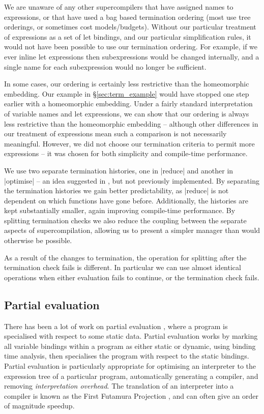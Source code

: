 \documentclass[draft]{sigplanconf}
\begin{document}
We are unaware of any other supercompilers that have assigned names to expressions, or that have used a bag based termination ordering (most use tree orderings, or sometimes cost models/budgets). Without our particular treatment of expressions as a set of let bindings, and our particular simplification rules, it would not have been possible to use our termination ordering. For example, if we ever inline let expressions then subexpressions would be changed internally, and a single name for each subexpression would no longer be sufficient.

In some cases, our ordering is certainly less restrictive than the homeomorphic embedding. Our example in \S\ref{sec:term_example} would have stopped one step earlier with a homeomorphic embedding. Under a fairly standard interpretation of variable names and let expressions, we can show that our ordering is always less restrictive than the homeomorphic embedding -- although other differences in our treatment of expressions mean such a comparison is not necessarily meaningful. However, we did not choose our termination criteria to permit more expressions -- it was chosen for both simplicity and compile-time performance.

We use two separate termination histories, one in |reduce| and another in |optimise| -- an idea suggested in \citet{ndm:thesis}, but not previously implemented. By separating the termination histories we gain better predictability, as |reduce| is not dependent on which functions have gone before. Additionally, the histories are kept substantially smaller, again improving compile-time performance. By splitting termination checks we also reduce the coupling between the separate aspects of supercompilation, allowing us to present a simpler manager than would otherwise be possible.

As a result of the changes to termination, the operation for splitting after the termination check fails is different. In particular we can use almost identical operations when either evaluation fails to continue, or the termination check fails.

\subsection{Partial evaluation}

There has been a lot of work on partial evaluation \cite{jones:partial_evaluation}, where a program is specialised with respect to some static data. Partial evaluation works by marking all variable bindings within a program as either static or dynamic, using binding time analysis, then specialises the program with respect to the static bindings. Partial evaluation is particularly appropriate for optimising an interpreter to the expression tree of a particular program, automatically generating a compiler, and removing \textit{interpretation overhead}. The translation of an interpreter into a compiler is known as the First Futamura Projection \cite{futanama:projections}, and can often give an order of magnitude speedup.
\end{document}
